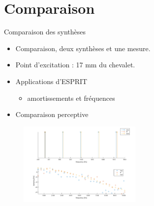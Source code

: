 \section{Comparaison}

\begin{frame}{Comparaison des synthèses}
 \begin{itemize}
  \item Comparaison, deux synthèses et une mesure.
  \item Point d'excitation : 17 mm du chevalet.
  \item Applications d'ESPRIT
  \begin{itemize}
    \item amortissements et fréquences
  \end{itemize}
  \item Comparaison perceptive
 \end{itemize}
 
 
      \begin{figure}
		\centering
		\includegraphics[width = 6cm]{figures/apotheose.png}
	\end{figure}
\end{frame}
